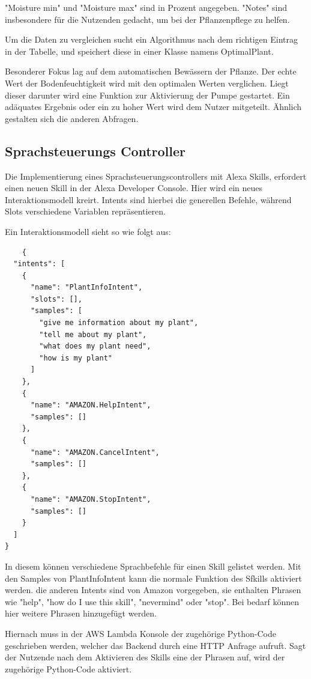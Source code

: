 "Moisture min" und "Moisture max" sind in Prozent angegeben. "Notes" sind insbesondere für die Nutzenden gedacht, um bei der Pflanzenpflege zu helfen.

Um die Daten zu vergleichen sucht ein Algorithmus nach dem richtigen Eintrag in der Tabelle, und speichert diese in einer Klasse namens OptimalPlant.

Besonderer Fokus lag auf dem automatischen Bewässern der Pflanze. Der echte Wert der Bodenfeuchtigkeit wird mit den optimalen Werten verglichen. Liegt dieser darunter wird eine Funktion zur Aktivierung der Pumpe gestartet. Ein adäquates Ergebnis oder ein zu hoher Wert wird dem Nutzer mitgeteilt. Ähnlich gestalten sich die anderen Abfragen.

\subsection{Sprachsteuerungs Controller}
Die Implementierung eines Sprachsteuerungscontrollers mit Alexa Skills, erfordert einen neuen Skill in der Alexa Developer Console. Hier wird ein neues Interaktionsmodell kreirt. Intents sind hierbei die generellen Befehle, während Slots verschiedene Variablen repräsentieren.

Ein Interaktionsmodell sieht so wie folgt aus:

\begin{verbatim}
    {
  "intents": [
    {
      "name": "PlantInfoIntent",
      "slots": [],
      "samples": [
        "give me information about my plant",
        "tell me about my plant",
        "what does my plant need",
        "how is my plant"
      ]
    },
    {
      "name": "AMAZON.HelpIntent",
      "samples": []
    },
    {
      "name": "AMAZON.CancelIntent",
      "samples": []
    },
    {
      "name": "AMAZON.StopIntent",
      "samples": []
    }
  ]
}
\end{verbatim}

In diesem können verschiedene Sprachbefehle für einen Skill gelistet werden. Mit den Samples von PlantInfoIntent kann die normale Funktion des Sfkills aktiviert werden. die anderen Intents sind von Amazon vorgegeben, sie enthalten Phrasen wie "help", "how do I use this skill", "nevermind" oder "stop". Bei bedarf können hier weitere Phrasen hinzugefügt werden.

Hiernach muss in der AWS Lambda Konsole der zugehörige Python-Code geschrieben werden, welcher das Backend durch eine HTTP Anfrage aufruft. Sagt der Nutzende nach dem Aktivieren des Skills eine der Phrasen auf, wird der zugehörige Python-Code aktiviert.

